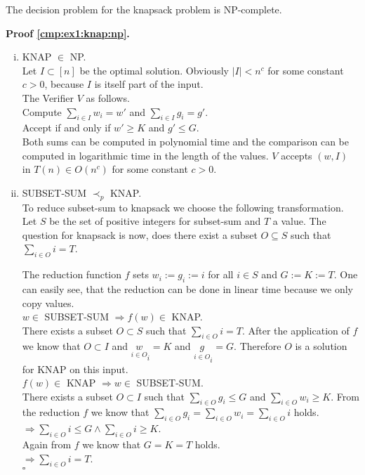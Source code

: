 \begin{lemma}\label{cmp:ex1:knap:np}
The decision problem for the knapsack problem is NP-complete.
\end{lemma}
\textbf{Proof \ref{cmp:ex1:knap:np}.}\\
\begin{enumerate}[i)]
    \item KNAP $\in$ NP.\\
        Let $I \subset [n]$ be the optimal solution. Obviously $|I| < n^c$ for some constant $c>0$,
        because $I$ is itself part of the input.\\
        The Verifier $V$ as follows.\\
        Compute $\underset{i \in I}{\sum} w_i = w'$ and 
        $\underset{i \in I}{\sum} g_i = g'$.\\
        Accept if and only if $w' \geq K$ and $ g' \leq G$.\\

        Both sums can be computed in polynomial time and the comparison can be computed
        in logarithmic time in the length of the values.
        $V$ accepts $(w,I)$ in $T(n) \in O(n^c)$ for some constant $c>0$.

    \item SUBSET-SUM $\prec_p$ KNAP.\\
        To reduce subset-sum to knapsack we choose the following transformation. Let $S$ be the set of
        positive integers for subset-sum and $T$ a value. The question for knapsack is now, does there exist
        a subset $O \subseteq S$ such that $\underset{i \in O}{\sum} i = T$.

        The reduction function $f$ sets $w_i := g_i := i$ for all $i \in S$ and $G := K := T$. One can
        easily see, that the reduction can be done in linear time because we only copy values. \\

        $w \in$ SUBSET-SUM $\Rightarrow f(w) \in$ KNAP.\\
        There exists a subset $O \subset S$ such that $\underset{i \in O}{\sum} i = T$.
        After the application of $f$ we know that $O \subset I$ and
        $\underset{i \in O} w_i = K$ and $\underset{i \in O} g_i = G$. Therefore $O$ is a solution for
        KNAP on this input.\\

        $f(w) \in$ KNAP $\Rightarrow w \in$ SUBSET-SUM.\\
        There exists a subset $O \subset I$ such that $\underset{i \in O}{\sum} g_i \leq G$ and $\underset{i \in O}{\sum} w_i \geq K$.
        From the reduction $f$ we know that $\underset{i \in O}{\sum} g_i = \underset{i \in O}{\sum} w_i = \underset{i \in O}{\sum} i$ holds.\\
        $\Rightarrow \underset{i \in O}{\sum} i \leq G \land \underset{i \in O}{\sum} i \geq K$.\\
        Again from $f$ we know that $G = K = T$ holds.\\
        $\Rightarrow \underset{i \in O}{\sum} i = T$.\\
\mbox{} \hfill $\square$
\end{enumerate}


